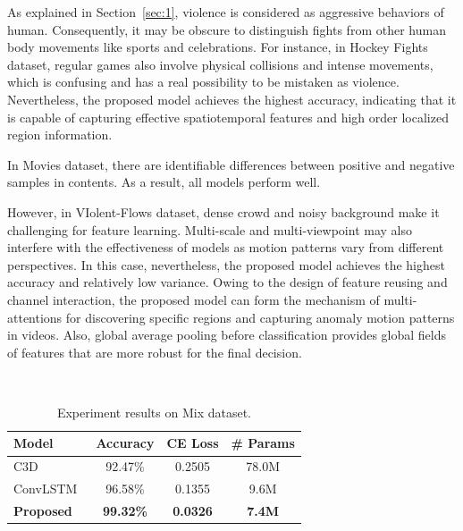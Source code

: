 \documentclass[10pt,twocolumn,letterpaper]{article}
\begin{document}
As explained in Section~\ref{sec:1}, violence is considered as aggressive behaviors of human. 
Consequently, it may be obscure to distinguish fights from other human body movements like sports and celebrations.
For instance, in Hockey Fights dataset, regular games also involve physical collisions and intense movements, which is confusing and has a real possibility to be mistaken as violence.
Nevertheless, the proposed model achieves the highest accuracy, indicating that it is capable of capturing effective spatiotemporal features and high order localized region information.

In Movies dataset, there are identifiable differences between positive and negative samples in contents.
As a result, all models perform well.

However, in VIolent-Flows dataset, dense crowd and noisy background make it challenging for feature learning.
Multi-scale and multi-viewpoint may also interfere with the effectiveness of models as motion patterns vary from different perspectives.
In this case, nevertheless, the proposed model achieves the highest accuracy and relatively low variance.
Owing to the design of feature reusing and channel interaction, the proposed model can form the mechanism of multi-attentions for discovering specific regions and capturing anomaly motion patterns in videos.
Also, global average pooling before classification provides global fields of features that are more robust for the final decision.


\begin{table}[t]
\begin{center}
\caption{Experiment results on Mix dataset.}
~\label{table:mix}
\begin{tabular}{lccc}
\hline
\textbf{Model} & \textbf{Accuracy} & \textbf{CE Loss} & \textbf{\# Params} \\
\hline\hline
C3D~\cite{3dcnn_1} & 92.47\% & 0.2505 & 78.0M \\
ConvLSTM~\cite{convlstm_sudh} & 96.58\% & 0.1355 & 9.6M \\
\textbf{Proposed} & \textbf{99.32\%} & \textbf{0.0326} & \textbf{7.4M} \\
\hline
\end{tabular}
\end{center}
\end{table}
\end{document}
